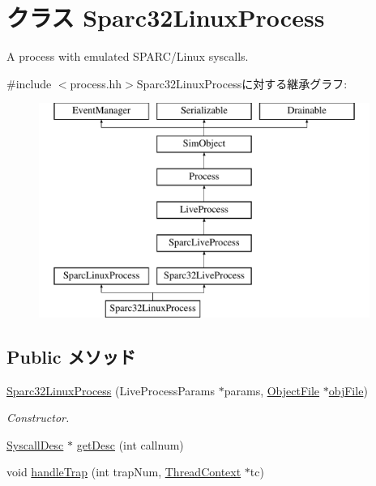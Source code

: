 \hypertarget{classSparcISA_1_1Sparc32LinuxProcess}{
\section{クラス Sparc32LinuxProcess}
\label{classSparcISA_1_1Sparc32LinuxProcess}
}


A process with emulated SPARC/Linux syscalls.  


{\ttfamily \#include $<$process.hh$>$}Sparc32LinuxProcessに対する継承グラフ:\begin{figure}[H]
\begin{center}
\leavevmode
\includegraphics[height=7cm]{classSparcISA_1_1Sparc32LinuxProcess}
\end{center}
\end{figure}
\subsection*{Public メソッド}
\begin{DoxyCompactItemize}
\item 
\hyperlink{classSparcISA_1_1Sparc32LinuxProcess_aab2d40cec112dec0eefda2a68893bf03}{Sparc32LinuxProcess} (LiveProcessParams $\ast$params, \hyperlink{classObjectFile}{ObjectFile} $\ast$\hyperlink{classLiveProcess_ab6cfcfa7903c66267b3e0351c3caa809}{objFile})
\begin{DoxyCompactList}\small\item\em Constructor. \item\end{DoxyCompactList}\item 
\hyperlink{classSyscallDesc}{SyscallDesc} $\ast$ \hyperlink{classSparcISA_1_1Sparc32LinuxProcess_a85e8ccf0c435d95c14574f0a217f5116}{getDesc} (int callnum)
\item 
void \hyperlink{classSparcISA_1_1Sparc32LinuxProcess_a7737d67ba76be0bd3beb0bd0dc93333a}{handleTrap} (int trapNum, \hyperlink{classThreadContext}{ThreadContext} $\ast$tc)
\end{DoxyCompactItemize}



